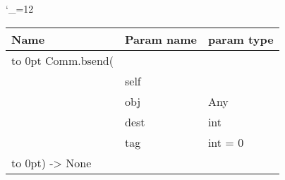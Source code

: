 \begingroup \catcode`\_=12 \tt
\begin{tabular}{lll}
\toprule
\textrm{Name}&\textrm{Param name}&\textrm{param type}\\
\midrule
\hbox to 0pt {Comm.bsend(\hss}\\
& self\\
& obj & Any\\
& dest & int\\
& tag & int = 0\\
\hbox to 0pt{) -> None\hss}\\
\bottomrule
\end{tabular}
\endgroup
